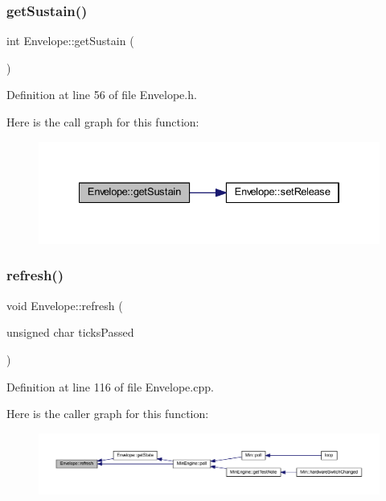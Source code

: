 \subsubsection{\texorpdfstring{get\+Sustain()}{getSustain()}}
{\footnotesize\ttfamily int Envelope\+::get\+Sustain (\begin{DoxyParamCaption}{ }\end{DoxyParamCaption})\hspace{0.3cm}{\ttfamily [inline]}}



Definition at line 56 of file Envelope.\+h.

Here is the call graph for this function\+:
\nopagebreak
\begin{figure}[H]
\begin{center}
\leavevmode
\includegraphics[width=334pt]{class_envelope_a4cc2bb1ba420ecd053c4a1ad8ed0ab7d_cgraph}
\end{center}
\end{figure}
\mbox{\label{class_envelope_ab039016897ae8b1edccd2eec7cb9b7f8}} 
\subsubsection{\texorpdfstring{refresh()}{refresh()}}
{\footnotesize\ttfamily void Envelope\+::refresh (\begin{DoxyParamCaption}\item[{unsigned char}]{ticks\+Passed }\end{DoxyParamCaption})}



Definition at line 116 of file Envelope.\+cpp.

Here is the caller graph for this function\+:
\nopagebreak
\begin{figure}[H]
\begin{center}
\leavevmode
\includegraphics[width=350pt]{class_envelope_ab039016897ae8b1edccd2eec7cb9b7f8_icgraph}
\end{center}
\end{figure}
\mbox{\label{class_envelope_ab21b5747de63336c4a525f3a7e728189}} 

